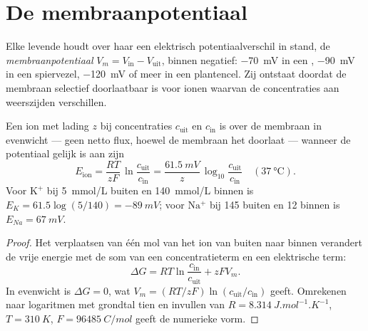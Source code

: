 \section{De membraanpotentiaal}

\begin{definition}[Membraanpotentiaal]\label{def:b1:membranes-transport:potential}
Elke levende  houdt over haar  een elektrisch
potentiaalverschil in stand, de
\emph{membraanpotentiaal}
$V_m = V_{\text{in}} - V_{\text{uit}}$, binnen negatief: \qty{-70}{mV} in een
, \qty{-90}{mV} in een spiervezel, \qty{-120}{mV} of meer in een plantencel.
Zij ontstaat doordat de membraan selectief doorlaatbaar is voor ionen waarvan de
concentraties aan weerszijden verschillen.
\end{definition}

\begin{theorem}[De nernstvergelijking]\label{thm:b1:membranes-transport:nernst}
Een ion met lading $z$ bij concentraties $c_{\text{uit}}$ en $c_{\text{in}}$ is
over de membraan in evenwicht --- geen netto flux, hoewel de membraan het
doorlaat --- wanneer de potentiaal gelijk is aan zijn
\emph{}
\[
E_{\text{ion}} = \frac{RT}{zF}\,\ln\frac{c_{\text{uit}}}{c_{\text{in}}}
= \frac{\qty{61.5}{mV}}{z}\,\log_{10}\frac{c_{\text{uit}}}{c_{\text{in}}}
\quad (\qty{37}{\celsius}).
\]
Voor $\mathrm{K^+}$ bij \qty{5}{mmol/L} buiten en \qty{140}{mmol/L} binnen is
$E_K = 61.5\log(5/140) = \qty{-89}{mV}$; voor $\mathrm{Na^+}$ bij \qty{145}{}
buiten en \qty{12}{} binnen is $E_{Na} = \qty{+67}{mV}$.
\end{theorem}
\begin{proof}
Het verplaatsen van één mol van het ion van buiten naar binnen verandert de vrije
energie met de som van een concentratieterm en een elektrische term:
\[
\Delta G = RT\ln\frac{c_{\text{in}}}{c_{\text{uit}}} + zFV_m .
\]
In evenwicht is $\Delta G = 0$, wat $V_m = (RT/zF)\ln(c_{\text{uit}}/c_{\text{in}})$
geeft. Omrekenen naar logaritmen met grondtal tien en invullen van
$R = \qty{8.314}{J.mol^{-1}.K^{-1}}$, $T = \qty{310}{K}$, $F = \qty{96485}{C/mol}$
geeft de numerieke vorm.
\end{proof}

